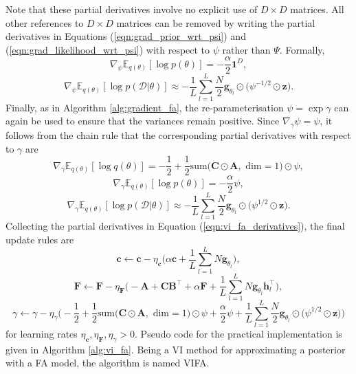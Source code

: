 \documentclass[msc,deptreport.inf]{infthesis} %
\newcommand{\matr}[1]{\mathbf{#1}}
\newcommand{\E}{\mathbb E}
\begin{document}
Note that these partial derivatives involve no explicit use of $D \times D$ matrices. All other references to $D \times D$ matrices can be removed by writing the partial derivatives in Equations (\ref{eqn:grad_prior_wrt_psi}) and (\ref{eqn:grad_likelihood_wrt_psi}) with respect to $\psi$ rather than $\Psi$. Formally,
\begin{equation}
	\nabla_\psi \E_{q(\theta)} [\log p(\theta)] = -\frac{\alpha}{2} \matr{1}^D,
\end{equation}
\begin{equation}
	\nabla_\psi \E_{q(\theta)} [\log p(\mathcal{D} | \theta)]
	 \approx  -\frac{1}{L} \sum_{l=1}^{L} \frac{N}{2} \matr{g}_{\theta_l} \odot \big(\psi^{-1/2} \odot \matr{z} \big).
\end{equation}
Finally, as in Algorithm \ref{alg:gradient_fa}, the re-parameterisation $\psi = \exp \gamma$ can again be used to ensure that the variances remain positive. Since $\nabla_\gamma \psi = \psi$, it follows from the chain rule that the corresponding partial derivatives with respect to $\gamma$ are 
\begin{equation}
	\nabla_\gamma \E_{q(\theta)} [\log q(\theta)] = -\frac{1}{2} + \frac{1}{2} \text{sum}\big(\matr{C} \odot \matr{A}, \text{ dim} = 1\big) \odot \psi,
\end{equation}
\begin{equation}
	\nabla_\gamma \E_{q(\theta)} [\log p(\theta)] = -\frac{\alpha}{2} \psi,
\end{equation}
\begin{equation}
	\nabla_\gamma \E_{q(\theta)} [\log p(\mathcal{D} | \theta)]
	 \approx  -\frac{1}{L} \sum_{l=1}^{L} \frac{N}{2} \matr{g}_{\theta_l} \odot \big(\psi^{1/2} \odot \matr{z} \big).
\end{equation}
Collecting the partial derivatives in Equation (\ref{eqn:vi_fa_derivatives}), the final update rules are
 \begin{equation}\label{eqn:vifa_c_update}
	\matr{c} \leftarrow \matr{c} - \eta_\matr{c}\Bigg(
	\alpha \matr{c} + \frac{1}{L} \sum_{l=1}^{L} N \matr{g}_{\theta_l}
	\Bigg),
\end{equation}
 \begin{equation}\label{eqn:vifa_F_update}
	\matr{F} \leftarrow \matr{F} - \eta_\matr{F}\Bigg(
	-\matr{A}  + \matr{C} \matr{B}^\intercal+ \alpha \matr{F} + \frac{1}{L} \sum_{l=1}^{L} N \matr{g}_{\theta_l} \matr{h}_l^\intercal
	\Bigg),
\end{equation}
\begin{equation}\label{eqn:vifa_gamma_update}
	\gamma \leftarrow \gamma - \eta_\gamma\Bigg(
	-\frac{1}{2} + \frac{1}{2} \text{sum}\big(\matr{C} \odot \matr{A}, \text{ dim} = 1\big) \odot \psi
	+\frac{\alpha}{2} \psi + \frac{1}{L} \sum_{l=1}^{L} \frac{N}{2} \matr{g}_{\theta_l} \odot \big(\psi^{1/2} \odot \matr{z} \big)
	\Bigg)
\end{equation}
for learning rates $\eta_\matr{c},  \eta_\matr{F}, \eta_\gamma > 0$. Pseudo code for the practical implementation is given in Algorithm \ref{alg:vi_fa}. Being a VI method for approximating a posterior with a FA model, the algorithm is named VIFA.
\end{document}
